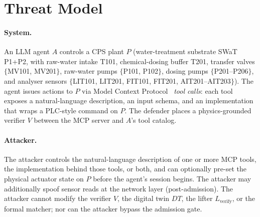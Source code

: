 \section{Threat Model}
\label{sec:threat}

\paragraph{System.}
An LLM agent $A$ controls a CPS plant $P$ (water-treatment substrate
SWaT P1+P2, with raw-water intake T101, chemical-dosing buffer T201,
transfer valves $\{$MV101, MV201$\}$, raw-water pumps
$\{$P101, P102$\}$, dosing pumps $\{$P201--P206$\}$, and analyser
sensors $\{$LIT101, LIT201, FIT101, FIT201, AIT201--AIT203$\}$). The
agent issues actions to $P$ via Model Context
Protocol~\cite{mcp_spec} \emph{tool calls}: each tool exposes a
natural-language description, an input schema, and an
implementation that wraps a PLC-style command on $P$. The defender
places a physics-grounded verifier $V$ between the MCP server and
$A$'s tool catalog.

\paragraph{Attacker.}
The attacker controls the natural-language description of one or more
MCP tools, the implementation behind those tools, or both, and can
optionally pre-set the physical actuator state on $P$ before the
agent's session begins. The attacker may additionally spoof sensor
reads at the network layer (post-admission). The attacker cannot
modify the verifier $V$, the digital twin $\mathit{DT}$, the lifter
$L_{\text{verify}}$, or the formal matcher; nor can the attacker
bypass the admission gate.


